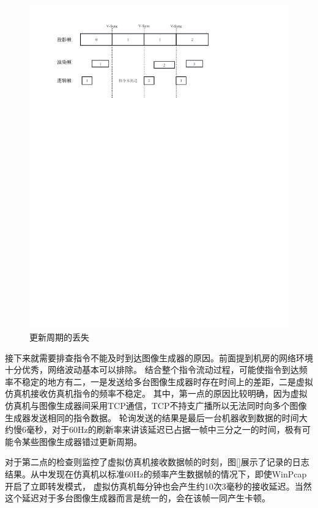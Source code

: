 \begin{figure}[h!]
    \begin{center}
        \includegraphics[width=\textwidth]{pictures/tearreason.pdf}
        \caption{更新周期的丢失}
        \label{tearreason}
    \end{center}
\end{figure}
\par 
接下来就需要排查指令不能及时到达图像生成器的原因。前面提到机房的网络环境十分优秀，网络波动基本可以排除。
结合整个指令流动过程，可能使指令到达频率不稳定的地方有二，一是发送给多台图像生成器时存在时间上的差距，二是虚拟仿真机接收仿真机指令的频率不稳定。
其中，第一点的原因比较明确，因为虚拟仿真机与图像生成器间采用TCP通信，TCP不持支广播所以无法同时向多个图像生成器发送相同的指令数据。
轮询发送的结果是最后一台机器收到数据的时间大约慢6毫秒，对于60Hz的刷新率来讲该延迟已占据一帧中三分之一的时间，极有可能令某些图像生成器错过更新周期。
\par
对于第二点的检查则监控了虚拟仿真机接收数据帧的时刻，图\ref{}展示了记录的日志结果。从中发现在仿真机以标准60Hz的频率产生数据帧的情况下，即使WinPcap开启了立即转发模式，
虚拟仿真机每分钟也会产生约10次3毫秒的接收延迟。当然这个延迟对于多台图像生成器而言是统一的，会在该帧一同产生卡顿。

